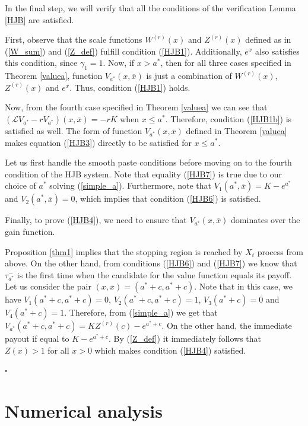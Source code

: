 \documentclass[10pt]{amsart}
\begin{document}
		
		In the final step, we will verify that all the conditions of the verification Lemma \ref{HJB} are satisfied.
		
		First, observe that the scale functions $W^{(r)}(x)$ and $Z^{(r)}(x)$ defined as in (\ref{W_sum}) and (\ref{Z_def}) fulfill condition (\ref{HJB1}). Additionally, $e^x$ also satisfies this condition, since $\gamma_1 = 1$. Now, if $x > a^*$, then for all three cases specified in Theorem \ref{valuea}, function $V_{a^*}(x,\overline{x})$ is just a combination of $W^{(r)}(x)$, $Z^{(r)}(x)$ and $e^x$. Thus, condition (\ref{HJB1}) holds.
		
		Now, from the fourth case specified in Theorem \ref{valuea} we can see that $(\mathcal{L} V_{a^*} - rV_{a^*})(x, \overline{x}) = -rK$ when $x \leq a^*$. Therefore, condition (\ref{HJB1b}) is satisfied as well. 
The form of function $V_{a^*}(x, \overline{x})$ defined in Theorem \ref{valuea} makes equation (\ref{HJB3}) directly to be satisfied for $x \leq a^*$.
		
		Let us first handle the smooth paste conditions before moving on to the fourth condition of the HJB system. Note that equality (\ref{HJB7}) is true due to our choice of $a^*$ solving (\ref{simple_a}). Furthermore, note that $V_1(a^*,\overline{x}) = K - e^{a^*}$ 
and $V_2(a^*,\overline{x}) = 0$, which implies that condition (\ref{HJB6}) is satisfied.
		
		Finally, to prove (\ref{HJB4}), we need to ensure that $V_{a^*}(x,\overline{x})$ dominates over the gain function.
		
Proposition \ref{thm1} implies that the stopping region is reached by $X_t$ process from above. On the other hand, from conditions (\ref{HJB6}) and (\ref{HJB7}) we know that $\tau_{a^*}^-$ is the first time when the candidate for the value function equals its payoff. %
Let us consider the pair $(x, \overline{x})=(a^*+c, a^*+c)$. Note that in this case, we have $V_1(a^*+c, a^*+c) = 0$, $V_2(a^*+c, a^*+c) = 1$, $V_3(a^*+c) = 0$ and $V_4(a^*+c) = 1$. Therefore, from (\ref{simple_a}) we get that $V_{a^*}(a^*+c, a^*+c) =  KZ^{(r)}(c) - e^{a^*+c}$. 
On the other hand, the immediate payout if equal to $K - e^{a^*+c}$. By (\ref{Z_def}) it immediately follows that $Z(x) > 1$ for all $x>0$ which makes condition (\ref{HJB4}) satisfied.
		
		\hfill$\square$	
		\section{Numerical analysis}\label{sec:num}
		
\end{document}
